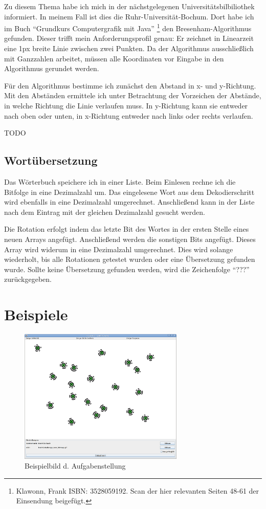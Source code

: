 	Zu diesem Thema habe ich mich in der nächstgelegenen Universitätsbilbiliothek informiert. In meinem Fall ist dies die Ruhr-Universität-Bochum. Dort habe ich im Buch "`Grundkurs Computergrafik mit Java"' \footnote{Klawonn, Frank ISBN: 3528059192. Scan der hier relevanten Seiten 48-61 der Einsendung beigefügt.} den Bresenham-Algorithmus gefunden. Dieser trifft mein Anforderungsprofil genau: Er zeichnet in Linearzeit eine 1px breite Linie zwischen zwei Punkten. Da der Algorithmus ausschließlich mit Ganzzahlen arbeitet, müssen alle Koordinaten vor Eingabe in den Algorithmus gerundet werden.

Für den Algorithmus bestimme ich zunächst den Abstand in x- und y-Richtung. Mit den Abständen ermittele ich unter Betrachtung der Vorzeichen der Abstände, in welche Richtung die Linie verlaufen muss. In y-Richtung kann sie entweder nach oben oder unten, in x-Richtung entweder nach links oder rechts verlaufen.

TODO

\subsection{Wortübersetzung}
Das Wörterbuch speichere ich in einer Liste. Beim Einlesen rechne ich die Bitfolge in eine Dezimalzahl um.
Das eingelesene Wort aus dem Dekodierschritt wird ebenfalls in eine Dezimalzahl umgerechnet. Anschließend kann in der Liste nach dem Eintrag mit der gleichen Dezimalzahl gesucht werden.

Die Rotation erfolgt indem das letzte Bit des Wortes in der ersten Stelle eines neuen Arrays angefügt. Anschließend werden die sonstigen Bits angefügt. Dieses Array wird widerum in eine Dezimalzahl umgerechnet. Dies wird solange wiederholt, bis alle Rotationen getestet wurden oder eine Übersetzung gefunden wurde.
Sollte keine Übersetzung gefunden werden, wird die Zeichenfolge "`???"' zurückgegeben. 

\section{Beispiele}
\begin{figure}[!ht]
	\centering	
	\includegraphics[width=0.7\textwidth]{Grafiken/sek2bsp1}
	\caption{Beispielbild d. Aufgabenstellung}
\end{figure}
